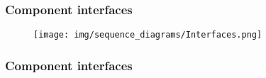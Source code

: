 	\subsubsection{Component interfaces}	
		\begin{figure}[h]
			\texttt{[image: img/sequence\_diagrams/Interfaces.png]}
		\end{figure}
		
		\paragraph{}
			
	\subsubsection{Component interfaces}